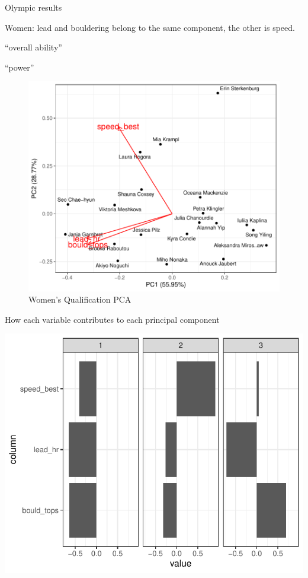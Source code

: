 \documentclass[12pt]{article}
\begin{document}
Olympic results

Women: lead and bouldering belong to the same component, the other is
speed.

``overall ability''

``power''

\begin{figure}

{\centering \includegraphics{draft_files/figure-latex/unnamed-chunk-23-1} 

}

\caption{Women's Qualification PCA}\label{fig:unnamed-chunk-23}
\end{figure}

How each variable contributes to each principal component

\begin{center}\includegraphics{draft_files/figure-latex/unnamed-chunk-24-1} \end{center}
\end{document}
